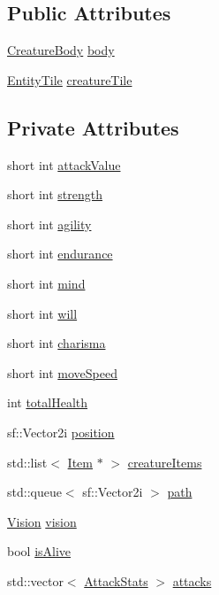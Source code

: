 \subsection*{Public Attributes}
\begin{DoxyCompactItemize}
\item 
\mbox{\hyperlink{class_creature_body}{Creature\+Body}} \mbox{\hyperlink{class_base_creature_a97e1d629325177b201bdcd43addefd0d}{body}}
\item 
\mbox{\hyperlink{class_entity_tile}{Entity\+Tile}} \mbox{\hyperlink{class_base_creature_a35d7353131ee00fe8738ec5a5ebfe231}{creature\+Tile}}
\end{DoxyCompactItemize}
\subsection*{Private Attributes}
\begin{DoxyCompactItemize}
\item 
short int \mbox{\hyperlink{class_base_creature_ac5a9c850146fa856dbf7fdd0def635ac}{attack\+Value}}
\item 
short int \mbox{\hyperlink{class_base_creature_a7f325c07376932d6e831dd00a350b806}{strength}}
\item 
short int \mbox{\hyperlink{class_base_creature_a23bbce83de8f7be2dfbcec7f5da223ab}{agility}}
\item 
short int \mbox{\hyperlink{class_base_creature_a74bc0648b11f9637b31ad5b76f056740}{endurance}}
\item 
short int \mbox{\hyperlink{class_base_creature_a8debd17b675db2ac6d944e2ccb314def}{mind}}
\item 
short int \mbox{\hyperlink{class_base_creature_a992cbd3a6be93279f2c933a50eba5000}{will}}
\item 
short int \mbox{\hyperlink{class_base_creature_aa62b65a4bd43be6e999d9a29a472fffe}{charisma}}
\item 
short int \mbox{\hyperlink{class_base_creature_a846cd45ba49c6496bdcb760651b9aaa8}{move\+Speed}}
\item 
int \mbox{\hyperlink{class_base_creature_a727462587a0ec421c549acf8c497de42}{total\+Health}}
\item 
sf\+::\+Vector2i \mbox{\hyperlink{class_base_creature_ac0aa7211db6bbc4033b0a11e6c34171b}{position}}
\item 
std\+::list$<$ \mbox{\hyperlink{class_item}{Item}} $\ast$ $>$ \mbox{\hyperlink{class_base_creature_a15a7a38b2a5bc15d1c3f8eda7e1d835b}{creature\+Items}}
\item 
std\+::queue$<$ sf\+::\+Vector2i $>$ \mbox{\hyperlink{class_base_creature_a0e419167e4986de0a4652b8979d66e16}{path}}
\item 
\mbox{\hyperlink{class_vision}{Vision}} \mbox{\hyperlink{class_base_creature_a8433c26fcbcb9bee87c35b15ae2e0814}{vision}}
\item 
bool \mbox{\hyperlink{class_base_creature_adeb6eed7546d84b1547e8134f582a6c7}{is\+Alive}}
\item 
std\+::vector$<$ \mbox{\hyperlink{struct_attack_stats}{Attack\+Stats}} $>$ \mbox{\hyperlink{class_base_creature_ab40c21845e4c19538b356bbcb01f7075}{attacks}}
\end{DoxyCompactItemize}


